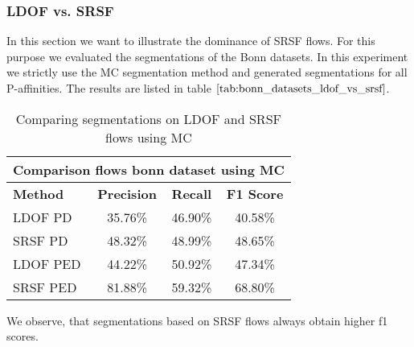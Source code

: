 \subsubsection{LDOF vs. SRSF}
In this section we want to illustrate the dominance of SRSF flows. For this purpose we evaluated the segmentations of the Bonn datasets. In this experiment we strictly use the MC segmentation method and generated segmentations for all P-affinities. The results are listed in table $\ref{tab:bonn_datasets_ldof_vs_srsf}$.
\begin{table}[H]
\centering
\begin{tabular}{|l|c|c|c|}
\hline
\multicolumn{4}{|c|}{Comparison flows bonn dataset using MC}                        \\ \hline
\textbf{Method} & \textbf{Precision} & \textbf{Recall} & \textbf{F1 Score}  \\ \hline
LDOF PD & 35.76\% & 46.90\% & 40.58\% \\ \hline
SRSF PD & 48.32\% & 48.99\% & 48.65\% \\ \hline
LDOF PED & 44.22\% & 50.92\% & 47.34\% \\ \hline
SRSF PED & 81.88\% & 59.32\% & 68.80\% \\ \hline
\end{tabular}
\caption[LDOF vs. SRSF: Bonn Datasets]{Comparing segmentations on LDOF and SRSF flows using MC}
\label{tab:bonn_datasets_ldof_vs_srsf}
\end{table}
We observe, that segmentations based on SRSF flows always obtain higher f1 scores.

